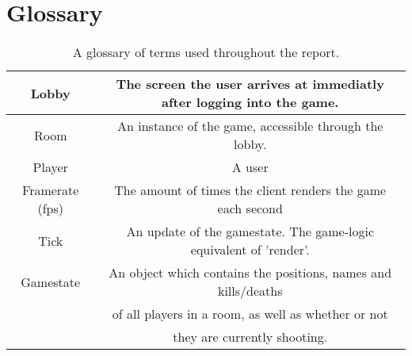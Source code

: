 \chapter{Glossary}

\begin{table}[H]
    \centering
    \begin{tabular}{|c|c|} \hline
        Lobby & The screen the user arrives at immediatly after logging into the game. \\ \hline
        Room & An instance of the game, accessible through the lobby.  \\ \hline
        Player & A user \\ \hline
        Framerate (fps) & The amount of times the client renders the game each second \\ \hline
        Tick & An update of the gamestate. The game-logic equivalent of 'render'. \\ \hline
        Gamestate & An object which contains the positions, names and kills/deaths\\ 
        & of all players in a room, as well as whether or not \\ 
        & they are currently shooting. \\ \hline
        
    \end{tabular}
    \caption{A glossary of terms used throughout the report.}
    \label{tab:glossary}
\end{table}

